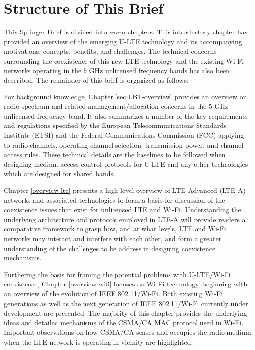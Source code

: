 \section{Structure of This Brief}

This Springer Brief is divided into seven chapters. This introductory chapter has provided an overview of the emerging \mbox{U-LTE} technology and its accompanying motivations, concepts, benefits, and challenges. The technical concerns surrounding the coexistence of this new LTE technology and the existing \mbox{Wi-Fi} networks operating in the $5$ GHz unlicensed frequency bands has also been described. The remainder of this brief is organized as follows: 

For background knowledge, Chapter \ref{sec:LBT-overview} provides an overview on radio spectrum and related management/allocation concerns in the $5$ GHz unlicensed frequency band. It also summarizes a number of the key requirements and regulations specified by the European Telecommunications Standards Institute (ETSI) and the Federal Communications Commission (FCC) applying to radio channels, operating channel selection, transmission power, and channel access rules. These technical details are the baselines to be followed when designing medium access control protocols for \mbox{U-LTE} and any other technologies which are designed for shared bands.

Chapter \ref{overview-lte} presents a high-level overview of LTE-Advanced (LTE-A) networks and associated technologies to form a basis for discussion of the coexistence issues that exist for unlicensed LTE and \mbox{Wi-Fi}. Understanding the underlying architecture and protocols employed in LTE-A will provide readers a comparative framework to grasp how, and at what levels, LTE and \mbox{Wi-Fi} networks may interact and interfere with each other, and form a greater understanding of the challenges to be address in designing coexistence mechanisms.

Furthering the basis for framing the potential problems with \mbox{U-LTE}/\mbox{Wi-Fi} coexistence, Chapter \ref{overview-wifi} focuses on \mbox{Wi-Fi} technology, beginning with an overview of the evolution of IEEE 802.11/\mbox{Wi-Fi}. Both existing \mbox{Wi-Fi} generations as well as the next generation of IEEE 802.11/\mbox{Wi-Fi} currently under development are presented. The majority of this chapter provides the underlying ideas and detailed mechanisms of the CSMA/CA MAC protocol used in \mbox{Wi-Fi}. Important observations on how CSMA/CA senses and occupies the radio medium when the LTE network is operating in vicinity are highlighted.

